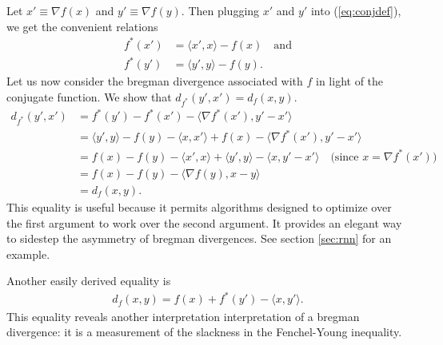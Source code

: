 \documentclass{article}
\begin{document}
Let $x' \equiv \nabla f(x)$ and $y' \equiv \nabla f(y)$.  
Then plugging $x'$ and $y'$ into (\ref{eq:conjdef}), we get the
convenient relations 
\begin{align*}
f^*(x') &= \langle x',x \rangle - f(x) \quad \mbox{and}\\
f^*(y') &= \langle y',y \rangle - f(y).
\end{align*}
Let us now consider the bregman divergence 
associated with $f$ in light of the conjugate function. We show
that $d_{f^*}(y',x') = 
d_f(x,y)$. 
\begin{align*}
d_{f^*}(y',x') &= f^*(y') - f^*(x') - \langle \nabla f^*(x'), y'-x'
\rangle \\
&= \langle y',y \rangle -f(y) - \langle x,x' \rangle + f(x) - \langle
\nabla f^*(x'), y'-x' \rangle\\
&= f(x) - f(y) -\langle x',x \rangle + \langle y',y
\rangle - \langle x,y' - x' \rangle \quad
\mbox{(since $x = \nabla f^*(x')$)}\\
&= f(x) - f(y) - \langle \nabla f(y),x-y \rangle \\
&= d_f(x,y).
\end{align*}
This equality is useful because it permits algorithms designed to
optimize over the first argument to work over the second argument.  It
provides an elegant way to sidestep the asymmetry of bregman
divergences.  See section \ref{sec:rnn} for an example.

Another easily derived equality is 
\begin{align} 
d_f(x,y) = f(x) + f^*(y') - \langle x,y'\rangle . \label{eq:breg-youngs}
\end{align}
This equality reveals another interpretation interpretation of a
bregman divergence: it is a measurement of the slackness in the
Fenchel-Young inequality. 
\end{document}
